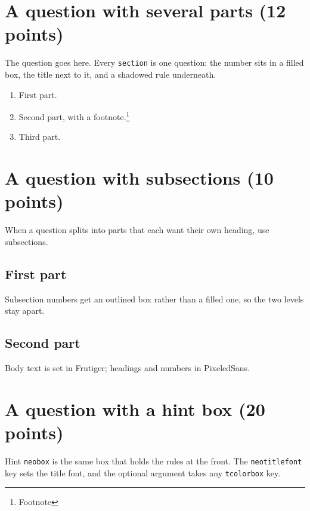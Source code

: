 \section{A question with several parts (12 points)}

The question goes here. Every \texttt{section} is one question: the number
sits in a filled box, the title next to it, and a shadowed rule underneath.

\begin{enumerate}
    \item First part.
    \item Second part, with a footnote.\footnote{Footnote}
    \item Third part.
\end{enumerate}

\section{A question with subsections (10 points)}

When a question splits into parts that each want their own heading, use
subsections.

\subsection{First part}

Subsection numbers get an outlined box rather than a filled one, so the two
levels stay apart.

\subsection{Second part}

Body text is set in Frutiger; headings and numbers in PixeledSans.

\section{A question with a hint box (20 points)}

\begin{neobox}[neotitlefont=\pixelfont]{Hint}
    \texttt{neobox} is the same box that holds the rules at the front. The
    \texttt{neotitlefont} key sets the title font, and the optional argument
    takes any \texttt{tcolorbox} key.
\end{neobox}
